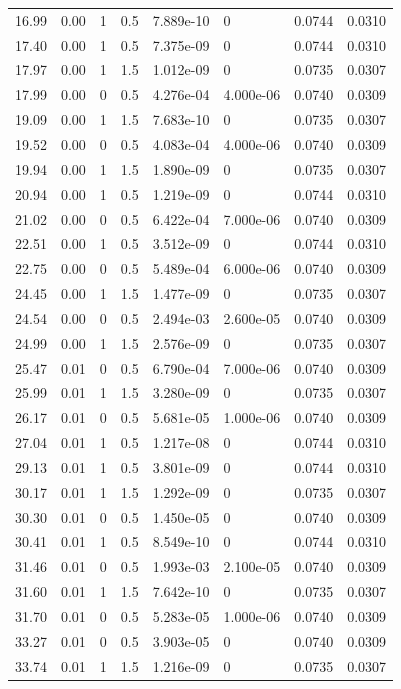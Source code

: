 \documentclass[preview]{standalone}
\begin{document}
{{\begin{tabular}{L{1.2cm}C{1.2cm} C{0.3cm}C{0.5cm} C{1.4cm}C{1.4cm} C{1.4cm}C{1.4cm}}
  16.99  &  0.00  & 1     & 0.5 &  7.889e-10  & 0  & 0.0744 &  0.0310   \\ 
  17.40  &  0.00  & 1     & 0.5 &  7.375e-09  & 0  & 0.0744 &  0.0310   \\ 
  17.97  &  0.00  & 1     & 1.5 &  1.012e-09  & 0  & 0.0735 &  0.0307   \\ 
  17.99  &  0.00  & 0     & 0.5 &  4.276e-04  & 4.000e-06  & 0.0740 &  0.0309   \\ 
  19.09  &  0.00  & 1     & 1.5 &  7.683e-10  & 0  & 0.0735 &  0.0307   \\ 
  19.52  &  0.00  & 0     & 0.5 &  4.083e-04  & 4.000e-06  & 0.0740 &  0.0309   \\ 
  19.94  &  0.00  & 1     & 1.5 &  1.890e-09  & 0  & 0.0735 &  0.0307   \\ 
  20.94  &  0.00  & 1     & 0.5 &  1.219e-09  & 0  & 0.0744 &  0.0310   \\ 
  21.02  &  0.00  & 0     & 0.5 &  6.422e-04  & 7.000e-06  & 0.0740 &  0.0309   \\ 
  22.51  &  0.00  & 1     & 0.5 &  3.512e-09  & 0  & 0.0744 &  0.0310   \\ 
  22.75  &  0.00  & 0     & 0.5 &  5.489e-04  & 6.000e-06  & 0.0740 &  0.0309   \\ 
  24.45  &  0.00  & 1     & 1.5 &  1.477e-09  & 0  & 0.0735 &  0.0307   \\ 
  24.54  &  0.00  & 0     & 0.5 &  2.494e-03  & 2.600e-05  & 0.0740 &  0.0309   \\ 
  24.99  &  0.00  & 1     & 1.5 &  2.576e-09  & 0  & 0.0735 &  0.0307   \\ 
  25.47  &  0.01  & 0     & 0.5 &  6.790e-04  & 7.000e-06  & 0.0740 &  0.0309   \\ 
  25.99  &  0.01  & 1     & 1.5 &  3.280e-09  & 0  & 0.0735 &  0.0307   \\ 
  26.17  &  0.01  & 0     & 0.5 &  5.681e-05  & 1.000e-06  & 0.0740 &  0.0309   \\ 
  27.04  &  0.01  & 1     & 0.5 &  1.217e-08  & 0  & 0.0744 &  0.0310   \\ 
  29.13  &  0.01  & 1     & 0.5 &  3.801e-09  & 0  & 0.0744 &  0.0310   \\ 
  30.17  &  0.01  & 1     & 1.5 &  1.292e-09  & 0  & 0.0735 &  0.0307   \\ 
  30.30  &  0.01  & 0     & 0.5 &  1.450e-05  & 0  & 0.0740 &  0.0309   \\ 
  30.41  &  0.01  & 1     & 0.5 &  8.549e-10  & 0  & 0.0744 &  0.0310   \\ 
  31.46  &  0.01  & 0     & 0.5 &  1.993e-03  & 2.100e-05  & 0.0740 &  0.0309   \\ 
  31.60  &  0.01  & 1     & 1.5 &  7.642e-10  & 0  & 0.0735 &  0.0307   \\ 
  31.70  &  0.01  & 0     & 0.5 &  5.283e-05  & 1.000e-06  & 0.0740 &  0.0309   \\ 
  33.27  &  0.01  & 0     & 0.5 &  3.903e-05  & 0  & 0.0740 &  0.0309   \\ 
  33.74  &  0.01  & 1     & 1.5 &  1.216e-09  & 0  & 0.0735 &  0.0307   \\ 
\hline 
\end{tabular} 

}}
\end{document}
